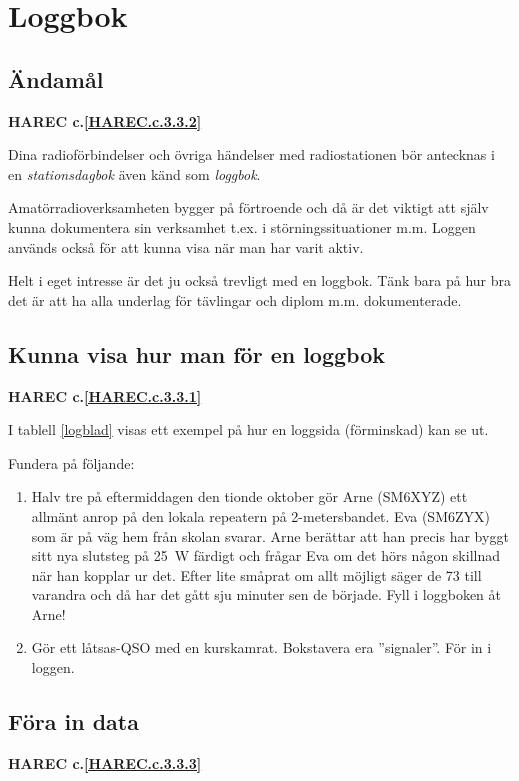 \section{Loggbok}

\subsection{Ändamål}
\textbf{HAREC
  c.\ref{HAREC.c.3.3.2}\label{myHAREC.c.3.3.2}
}

Dina radioförbindelser och övriga händelser med radiostationen bör
antecknas i en \emph{stationsdagbok} även känd som \emph{loggbok}.

Amatörradioverksamheten bygger på förtroende och då är det viktigt att
själv kunna dokumentera sin verksamhet t.ex. i störningssituationer m.m.
Loggen används också för att kunna visa när man har varit aktiv.

Helt i eget intresse är det ju också trevligt med en loggbok.
Tänk bara på hur bra det är att ha alla underlag för tävlingar och diplom
m.m. dokumenterade.

\subsection{Kunna visa hur man för en loggbok}
\textbf{HAREC
  c.\ref{HAREC.c.3.3.1}\label{myHAREC.c.3.3.1}
}

I tablell \ref{logblad} visas ett exempel på hur en loggsida (förminskad)
kan se ut.

Fundera på följande:
\begin{enumerate}
\item Halv tre på eftermiddagen den tionde oktober gör Arne (SM6XYZ)
  ett allmänt anrop på den lokala repeatern på 2-metersbandet.
  Eva (SM6ZYX) som är på väg hem från skolan svarar.
  Arne berättar att han precis har byggt sitt nya slutsteg på 25~W
  färdigt och frågar Eva om det hörs någon skillnad när han kopplar ur det.
  Efter lite småprat om allt möjligt säger de 73 till varandra och då har det
  gått sju minuter sen de började.
  Fyll i loggboken åt Arne!
\item Gör ett låtsas-QSO med en kurskamrat.
  Bokstavera era ''signaler''.
  För in i loggen.
\end{enumerate}

\subsection{Föra in data}
\textbf{HAREC
  c.\ref{HAREC.c.3.3.3}\label{myHAREC.c.3.3.3}
}

